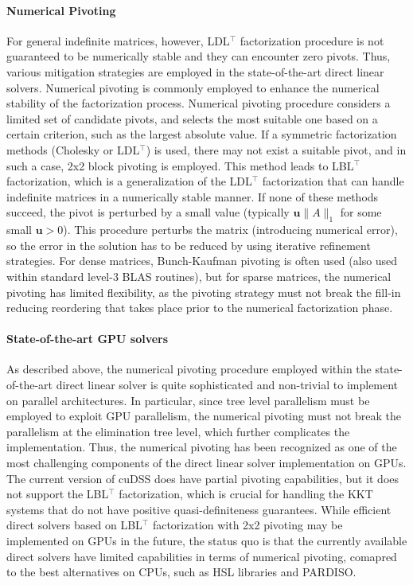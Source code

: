 \documentclass{article}
\begin{document}
\paragraph{Numerical Pivoting}
For general indefinite matrices, however, LDL$^\top$ factorization procedure is not guaranteed to be numerically stable and they can encounter zero pivots.
Thus, various mitigation strategies are employed in the state-of-the-art direct linear solvers.
Numerical pivoting is commonly employed to enhance the numerical stability of the factorization process. Numerical pivoting procedure considers a limited set of candidate pivots, and selects the most suitable one based on a certain criterion, such as the largest absolute value. If a symmetric factorization methods (Cholesky or LDL$^\top$) is used, there may not exist a suitable pivot, and in such a case, 2x2 block pivoting is employed. This method leads to LBL$^\top$ factorization, which is a generalization of the LDL$^\top$ factorization that can handle indefinite matrices in a numerically stable manner. If none of these methods succeed, the pivot is perturbed by a small value (typically $\mathbf{u}\|A\|_1$ for some small $\mathbf{u} > 0$). This procedure perturbs the matrix (introducing numerical error), so the error in the solution has to be reduced by using iterative refinement strategies. For dense matrices, Bunch-Kaufman pivoting is often used (also used within standard level-3 BLAS routines), but for sparse matrices, the numerical pivoting has limited flexibility, as the pivoting strategy must not break the fill-in reducing reordering that takes place prior to the numerical factorization phase.

\paragraph{State-of-the-art GPU solvers}
As described above, the numerical pivoting procedure employed within the state-of-the-art direct linear solver is quite sophisticated and non-trivial to implement on parallel architectures. In particular, since tree level parallelism must be employed to exploit GPU parallelism, the numerical pivoting must not break the parallelism at the elimination tree level, which further complicates the implementation. Thus, the numerical pivoting has been recognized as one of the most challenging components of the direct linear solver implementation on GPUs. The current version of cuDSS does have partial pivoting capabilities, but it does not support the LBL$^\top$ factorization, which is crucial for handling the KKT systems that do not have positive quasi-definiteness guarantees. While efficient direct solvers based on LBL$^\top$ factorization with 2x2 pivoting may be implemented on GPUs in the future, the status quo is that the currently available direct solvers have limited capabilities in terms of numerical pivoting, comapred to the best alternatives on CPUs, such as HSL libraries and PARDISO.
\end{document}
